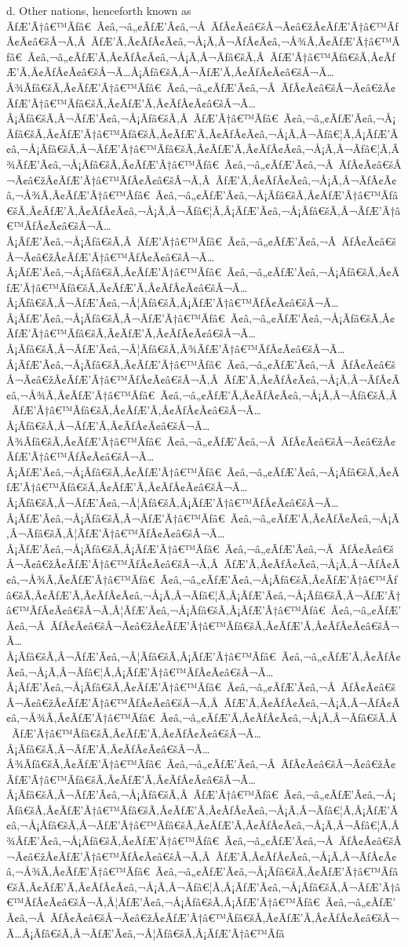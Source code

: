 \documentclass{article}
\begin{document}
\begin{outline}[enumerate]
\2 d.	Other nations, henceforth known as ÃƒÆ’Ã†â€™Ãƒâ€ Ã¢â‚¬â„¢ÃƒÆ’Ã¢â‚¬Â ÃƒÂ¢Ã¢â€šÂ¬Ã¢â€žÂ¢ÃƒÆ’Ã†â€™ÃƒÂ¢Ã¢â€šÂ¬Ã‚Â ÃƒÆ’Ã‚Â¢ÃƒÂ¢Ã¢â‚¬Å¡Ã‚Â¬ÃƒÂ¢Ã¢â‚¬Å¾Ã‚Â¢ÃƒÆ’Ã†â€™Ãƒâ€ Ã¢â‚¬â„¢ÃƒÆ’Ã‚Â¢ÃƒÂ¢Ã¢â‚¬Å¡Ã‚Â¬Ãƒâ€šÃ‚Â ÃƒÆ’Ã†â€™Ãƒâ€šÃ‚Â¢ÃƒÆ’Ã‚Â¢ÃƒÂ¢Ã¢â€šÂ¬Ã…Â¡Ãƒâ€šÃ‚Â¬ÃƒÆ’Ã‚Â¢ÃƒÂ¢Ã¢â€šÂ¬Ã…Â¾Ãƒâ€šÃ‚Â¢ÃƒÆ’Ã†â€™Ãƒâ€ Ã¢â‚¬â„¢ÃƒÆ’Ã¢â‚¬Â ÃƒÂ¢Ã¢â€šÂ¬Ã¢â€žÂ¢ÃƒÆ’Ã†â€™Ãƒâ€šÃ‚Â¢ÃƒÆ’Ã‚Â¢ÃƒÂ¢Ã¢â€šÂ¬Ã…Â¡Ãƒâ€šÃ‚Â¬ÃƒÆ’Ã¢â‚¬Å¡Ãƒâ€šÃ‚Â ÃƒÆ’Ã†â€™Ãƒâ€ Ã¢â‚¬â„¢ÃƒÆ’Ã¢â‚¬Å¡Ãƒâ€šÃ‚Â¢ÃƒÆ’Ã†â€™Ãƒâ€šÃ‚Â¢ÃƒÆ’Ã‚Â¢ÃƒÂ¢Ã¢â‚¬Å¡Ã‚Â¬Ãƒâ€¦Ã‚Â¡ÃƒÆ’Ã¢â‚¬Å¡Ãƒâ€šÃ‚Â¬ÃƒÆ’Ã†â€™Ãƒâ€šÃ‚Â¢ÃƒÆ’Ã‚Â¢ÃƒÂ¢Ã¢â‚¬Å¡Ã‚Â¬Ãƒâ€¦Ã‚Â¾ÃƒÆ’Ã¢â‚¬Å¡Ãƒâ€šÃ‚Â¢ÃƒÆ’Ã†â€™Ãƒâ€ Ã¢â‚¬â„¢ÃƒÆ’Ã¢â‚¬Â ÃƒÂ¢Ã¢â€šÂ¬Ã¢â€žÂ¢ÃƒÆ’Ã†â€™ÃƒÂ¢Ã¢â€šÂ¬Ã‚Â ÃƒÆ’Ã‚Â¢ÃƒÂ¢Ã¢â‚¬Å¡Ã‚Â¬ÃƒÂ¢Ã¢â‚¬Å¾Ã‚Â¢ÃƒÆ’Ã†â€™Ãƒâ€ Ã¢â‚¬â„¢ÃƒÆ’Ã¢â‚¬Å¡Ãƒâ€šÃ‚Â¢ÃƒÆ’Ã†â€™Ãƒâ€šÃ‚Â¢ÃƒÆ’Ã‚Â¢ÃƒÂ¢Ã¢â‚¬Å¡Ã‚Â¬Ãƒâ€¦Ã‚Â¡ÃƒÆ’Ã¢â‚¬Å¡Ãƒâ€šÃ‚Â¬ÃƒÆ’Ã†â€™ÃƒÂ¢Ã¢â€šÂ¬Ã…Â¡ÃƒÆ’Ã¢â‚¬Å¡Ãƒâ€šÃ‚Â ÃƒÆ’Ã†â€™Ãƒâ€ Ã¢â‚¬â„¢ÃƒÆ’Ã¢â‚¬Â ÃƒÂ¢Ã¢â€šÂ¬Ã¢â€žÂ¢ÃƒÆ’Ã†â€™ÃƒÂ¢Ã¢â€šÂ¬Ã…Â¡ÃƒÆ’Ã¢â‚¬Å¡Ãƒâ€šÃ‚Â¢ÃƒÆ’Ã†â€™Ãƒâ€ Ã¢â‚¬â„¢ÃƒÆ’Ã¢â‚¬Å¡Ãƒâ€šÃ‚Â¢ÃƒÆ’Ã†â€™Ãƒâ€šÃ‚Â¢ÃƒÆ’Ã‚Â¢ÃƒÂ¢Ã¢â€šÂ¬Ã…Â¡Ãƒâ€šÃ‚Â¬ÃƒÆ’Ã¢â‚¬Â¦Ãƒâ€šÃ‚Â¡ÃƒÆ’Ã†â€™ÃƒÂ¢Ã¢â€šÂ¬Ã…Â¡ÃƒÆ’Ã¢â‚¬Å¡Ãƒâ€šÃ‚Â¬ÃƒÆ’Ã†â€™Ãƒâ€ Ã¢â‚¬â„¢ÃƒÆ’Ã¢â‚¬Å¡Ãƒâ€šÃ‚Â¢ÃƒÆ’Ã†â€™Ãƒâ€šÃ‚Â¢ÃƒÆ’Ã‚Â¢ÃƒÂ¢Ã¢â€šÂ¬Ã…Â¡Ãƒâ€šÃ‚Â¬ÃƒÆ’Ã¢â‚¬Â¦Ãƒâ€šÃ‚Â¾ÃƒÆ’Ã†â€™ÃƒÂ¢Ã¢â€šÂ¬Ã…Â¡ÃƒÆ’Ã¢â‚¬Å¡Ãƒâ€šÃ‚Â¢ÃƒÆ’Ã†â€™Ãƒâ€ Ã¢â‚¬â„¢ÃƒÆ’Ã¢â‚¬Â ÃƒÂ¢Ã¢â€šÂ¬Ã¢â€žÂ¢ÃƒÆ’Ã†â€™ÃƒÂ¢Ã¢â€šÂ¬Ã‚Â ÃƒÆ’Ã‚Â¢ÃƒÂ¢Ã¢â‚¬Å¡Ã‚Â¬ÃƒÂ¢Ã¢â‚¬Å¾Ã‚Â¢ÃƒÆ’Ã†â€™Ãƒâ€ Ã¢â‚¬â„¢ÃƒÆ’Ã‚Â¢ÃƒÂ¢Ã¢â‚¬Å¡Ã‚Â¬Ãƒâ€šÃ‚Â ÃƒÆ’Ã†â€™Ãƒâ€šÃ‚Â¢ÃƒÆ’Ã‚Â¢ÃƒÂ¢Ã¢â€šÂ¬Ã…Â¡Ãƒâ€šÃ‚Â¬ÃƒÆ’Ã‚Â¢ÃƒÂ¢Ã¢â€šÂ¬Ã…Â¾Ãƒâ€šÃ‚Â¢ÃƒÆ’Ã†â€™Ãƒâ€ Ã¢â‚¬â„¢ÃƒÆ’Ã¢â‚¬Â ÃƒÂ¢Ã¢â€šÂ¬Ã¢â€žÂ¢ÃƒÆ’Ã†â€™ÃƒÂ¢Ã¢â€šÂ¬Ã…Â¡ÃƒÆ’Ã¢â‚¬Å¡Ãƒâ€šÃ‚Â¢ÃƒÆ’Ã†â€™Ãƒâ€ Ã¢â‚¬â„¢ÃƒÆ’Ã¢â‚¬Å¡Ãƒâ€šÃ‚Â¢ÃƒÆ’Ã†â€™Ãƒâ€šÃ‚Â¢ÃƒÆ’Ã‚Â¢ÃƒÂ¢Ã¢â€šÂ¬Ã…Â¡Ãƒâ€šÃ‚Â¬ÃƒÆ’Ã¢â‚¬Â¦Ãƒâ€šÃ‚Â¡ÃƒÆ’Ã†â€™ÃƒÂ¢Ã¢â€šÂ¬Ã…Â¡ÃƒÆ’Ã¢â‚¬Å¡Ãƒâ€šÃ‚Â¬ÃƒÆ’Ã†â€™Ãƒâ€ Ã¢â‚¬â„¢ÃƒÆ’Ã‚Â¢ÃƒÂ¢Ã¢â‚¬Å¡Ã‚Â¬Ãƒâ€šÃ‚Â¦ÃƒÆ’Ã†â€™ÃƒÂ¢Ã¢â€šÂ¬Ã…Â¡ÃƒÆ’Ã¢â‚¬Å¡Ãƒâ€šÃ‚Â¡ÃƒÆ’Ã†â€™Ãƒâ€ Ã¢â‚¬â„¢ÃƒÆ’Ã¢â‚¬Â ÃƒÂ¢Ã¢â€šÂ¬Ã¢â€žÂ¢ÃƒÆ’Ã†â€™ÃƒÂ¢Ã¢â€šÂ¬Ã‚Â ÃƒÆ’Ã‚Â¢ÃƒÂ¢Ã¢â‚¬Å¡Ã‚Â¬ÃƒÂ¢Ã¢â‚¬Å¾Ã‚Â¢ÃƒÆ’Ã†â€™Ãƒâ€ Ã¢â‚¬â„¢ÃƒÆ’Ã¢â‚¬Å¡Ãƒâ€šÃ‚Â¢ÃƒÆ’Ã†â€™Ãƒâ€šÃ‚Â¢ÃƒÆ’Ã‚Â¢ÃƒÂ¢Ã¢â‚¬Å¡Ã‚Â¬Ãƒâ€¦Ã‚Â¡ÃƒÆ’Ã¢â‚¬Å¡Ãƒâ€šÃ‚Â¬ÃƒÆ’Ã†â€™ÃƒÂ¢Ã¢â€šÂ¬Ã‚Â¦ÃƒÆ’Ã¢â‚¬Å¡Ãƒâ€šÃ‚Â¡ÃƒÆ’Ã†â€™Ãƒâ€ Ã¢â‚¬â„¢ÃƒÆ’Ã¢â‚¬Â ÃƒÂ¢Ã¢â€šÂ¬Ã¢â€žÂ¢ÃƒÆ’Ã†â€™Ãƒâ€šÃ‚Â¢ÃƒÆ’Ã‚Â¢ÃƒÂ¢Ã¢â€šÂ¬Ã…Â¡Ãƒâ€šÃ‚Â¬ÃƒÆ’Ã¢â‚¬Â¦Ãƒâ€šÃ‚Â¡ÃƒÆ’Ã†â€™Ãƒâ€ Ã¢â‚¬â„¢ÃƒÆ’Ã‚Â¢ÃƒÂ¢Ã¢â‚¬Å¡Ã‚Â¬Ãƒâ€¦Ã‚Â¡ÃƒÆ’Ã†â€™ÃƒÂ¢Ã¢â€šÂ¬Ã…Â¡ÃƒÆ’Ã¢â‚¬Å¡Ãƒâ€šÃ‚Â¢ÃƒÆ’Ã†â€™Ãƒâ€ Ã¢â‚¬â„¢ÃƒÆ’Ã¢â‚¬Â ÃƒÂ¢Ã¢â€šÂ¬Ã¢â€žÂ¢ÃƒÆ’Ã†â€™ÃƒÂ¢Ã¢â€šÂ¬Ã‚Â ÃƒÆ’Ã‚Â¢ÃƒÂ¢Ã¢â‚¬Å¡Ã‚Â¬ÃƒÂ¢Ã¢â‚¬Å¾Ã‚Â¢ÃƒÆ’Ã†â€™Ãƒâ€ Ã¢â‚¬â„¢ÃƒÆ’Ã‚Â¢ÃƒÂ¢Ã¢â‚¬Å¡Ã‚Â¬Ãƒâ€šÃ‚Â ÃƒÆ’Ã†â€™Ãƒâ€šÃ‚Â¢ÃƒÆ’Ã‚Â¢ÃƒÂ¢Ã¢â€šÂ¬Ã…Â¡Ãƒâ€šÃ‚Â¬ÃƒÆ’Ã‚Â¢ÃƒÂ¢Ã¢â€šÂ¬Ã…Â¾Ãƒâ€šÃ‚Â¢ÃƒÆ’Ã†â€™Ãƒâ€ Ã¢â‚¬â„¢ÃƒÆ’Ã¢â‚¬Â ÃƒÂ¢Ã¢â€šÂ¬Ã¢â€žÂ¢ÃƒÆ’Ã†â€™Ãƒâ€šÃ‚Â¢ÃƒÆ’Ã‚Â¢ÃƒÂ¢Ã¢â€šÂ¬Ã…Â¡Ãƒâ€šÃ‚Â¬ÃƒÆ’Ã¢â‚¬Å¡Ãƒâ€šÃ‚Â ÃƒÆ’Ã†â€™Ãƒâ€ Ã¢â‚¬â„¢ÃƒÆ’Ã¢â‚¬Å¡Ãƒâ€šÃ‚Â¢ÃƒÆ’Ã†â€™Ãƒâ€šÃ‚Â¢ÃƒÆ’Ã‚Â¢ÃƒÂ¢Ã¢â‚¬Å¡Ã‚Â¬Ãƒâ€¦Ã‚Â¡ÃƒÆ’Ã¢â‚¬Å¡Ãƒâ€šÃ‚Â¬ÃƒÆ’Ã†â€™Ãƒâ€šÃ‚Â¢ÃƒÆ’Ã‚Â¢ÃƒÂ¢Ã¢â‚¬Å¡Ã‚Â¬Ãƒâ€¦Ã‚Â¾ÃƒÆ’Ã¢â‚¬Å¡Ãƒâ€šÃ‚Â¢ÃƒÆ’Ã†â€™Ãƒâ€ Ã¢â‚¬â„¢ÃƒÆ’Ã¢â‚¬Â ÃƒÂ¢Ã¢â€šÂ¬Ã¢â€žÂ¢ÃƒÆ’Ã†â€™ÃƒÂ¢Ã¢â€šÂ¬Ã‚Â ÃƒÆ’Ã‚Â¢ÃƒÂ¢Ã¢â‚¬Å¡Ã‚Â¬ÃƒÂ¢Ã¢â‚¬Å¾Ã‚Â¢ÃƒÆ’Ã†â€™Ãƒâ€ Ã¢â‚¬â„¢ÃƒÆ’Ã¢â‚¬Å¡Ãƒâ€šÃ‚Â¢ÃƒÆ’Ã†â€™Ãƒâ€šÃ‚Â¢ÃƒÆ’Ã‚Â¢ÃƒÂ¢Ã¢â‚¬Å¡Ã‚Â¬Ãƒâ€¦Ã‚Â¡ÃƒÆ’Ã¢â‚¬Å¡Ãƒâ€šÃ‚Â¬ÃƒÆ’Ã†â€™ÃƒÂ¢Ã¢â€šÂ¬Ã‚Â¦ÃƒÆ’Ã¢â‚¬Å¡Ãƒâ€šÃ‚Â¡ÃƒÆ’Ã†â€™Ãƒâ€ Ã¢â‚¬â„¢ÃƒÆ’Ã¢â‚¬Â ÃƒÂ¢Ã¢â€šÂ¬Ã¢â€žÂ¢ÃƒÆ’Ã†â€™Ãƒâ€šÃ‚Â¢ÃƒÆ’Ã‚Â¢ÃƒÂ¢Ã¢â€šÂ¬Ã…Â¡Ãƒâ€šÃ‚Â¬ÃƒÆ’Ã¢â‚¬Â¦Ãƒâ€šÃ‚Â¡ÃƒÆ’Ã†â€™Ãƒâ
\end{outline}
\end{document}
